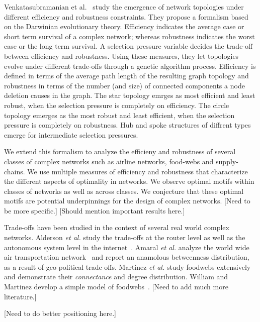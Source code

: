 \documentclass[twocolumn,showpacs,preprintnumbers,amsmath,amssymb]{revtex4}
\begin{document}
Venkatasubramanian et al.~\cite{venkat04} study the emergence of network topologies under different efficiency and robustness constraints. They propose a formalism based on the Darwinian evolutionary theory. Efficiency indicates the average case or short term survival of a complex network; whereas robustness indicates the worst case or the long term survival. A selection pressure variable decides the trade-off between efficiency and robustness. Using these measures, they let topologies evolve under different trade-offs through a genetic algorithm process. Efficiency is defined in terms of the average path length of the resulting graph topology and robustness in terms of the number (and size) of connected components a node deletion causes in the graph. The star topology emrges as most efficient and least robust, when the selection pressure is completely on efficiency. The circle topology emerges as the most robust and least efficient, when the selection pressure is completely on robustness. Hub and spoke structures of diffrent types emerge for intermediate selection pressures.

We extend this formalism to analyze the efficieny and robustness of several classes of complex networks such as airline networks, food-webs and supply-chains. We use multiple measures of efficiency and robustness that characterize the different aspects of optimality in networks. We observe optimal motifs within classes of networks as well as across classes. We conjecture that these optimal motifs are potential underpinnings for the design of complex networks. [Need to be more specific.] [Should mention important results here.]

Trade-offs have been studied in the context of several real world complex networks. Alderson \textit{et al.} study the trade-offs at the router level as well as the autonomous system level in the internet~\cite{hot-internet}. Amaral \textit{et al.} analyze the world wide air transportation network~\cite{amaral05} and report an anamolous betweenness distribution, as a result of geo-political trade-offs. Martinez \textit{et al.} study foodwebs extensively and demonstrate their \textit{connectance} and degree distribution. William and Martinez develop a simple model of foodwebs~\cite{foodweb-model}.
[Need to add much more literature.]

[Need to do better positioning here.]
\end{document}
